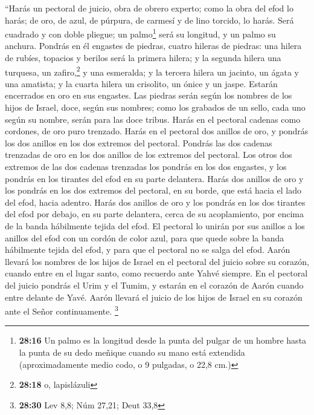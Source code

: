 \begin{paracol}{2}
 ``Harás un pectoral de juicio, obra de obrero experto;
como la obra del efod lo harás; de oro, de azul, de púrpura, de carmesí
y de lino torcido, lo harás.  Será cuadrado y con doble
pliegue; un palmo\footnote{\textbf{28:16} Un palmo es la longitud desde
  la punta del pulgar de un hombre hasta la punta de su dedo meñique
  cuando su mano está extendida (aproximadamente medio codo, o 9
  pulgadas, o 22,8 cm.)} será su longitud, y un palmo su anchura.
 Pondrás en él engastes de piedras, cuatro hileras de
piedras: una hilera de rubíes, topacios y berilos será la primera
hilera;  y la segunda hilera una turquesa, un
zafiro,\footnote{\textbf{28:18} o, lapislázuli} y una esmeralda;
 y la tercera hilera un jacinto, un ágata y una amatista;
 y la cuarta hilera un crisolito, un ónice y un jaspe.
Estarán encerrados en oro en sus engastes.  Las piedras
serán según los nombres de los hijos de Israel, doce, según sus nombres;
como los grabados de un sello, cada uno según su nombre, serán para las
doce tribus.  Harás en el pectoral cadenas como cordones,
de oro puro trenzado.  Harás en el pectoral dos anillos
de oro, y pondrás los dos anillos en los dos extremos del pectoral.
 Pondrás las dos cadenas trenzadas de oro en los dos
anillos de los extremos del pectoral.  Los otros dos
extremos de las dos cadenas trenzadas los pondrás en los dos engastes, y
los pondrás en los tirantes del efod en su parte delantera.
 Harás dos anillos de oro y los pondrás en los dos
extremos del pectoral, en su borde, que está hacia el lado del efod,
hacia adentro.  Harás dos anillos de oro y los pondrás en
los dos tirantes del efod por debajo, en su parte delantera, cerca de su
acoplamiento, por encima de la banda hábilmente tejida del efod.
 El pectoral lo unirán por sus anillos a los anillos del
efod con un cordón de color azul, para que quede sobre la banda
hábilmente tejida del efod, y para que el pectoral no se salga del efod.
 Aarón llevará los nombres de los hijos de Israel en el
pectoral del juicio sobre su corazón, cuando entre en el lugar santo,
como recuerdo ante Yahvé siempre.  En el pectoral del
juicio pondrás el Urim y el Tumim, y estarán en el corazón de Aarón
cuando entre delante de Yavé. Aarón llevará el juicio de los hijos de
Israel en su corazón ante el Señor continuamente. \footnote{\textbf{28:30}
  Lev 8,8; Núm 27,21; Deut 33,8}


\end{paracol}
